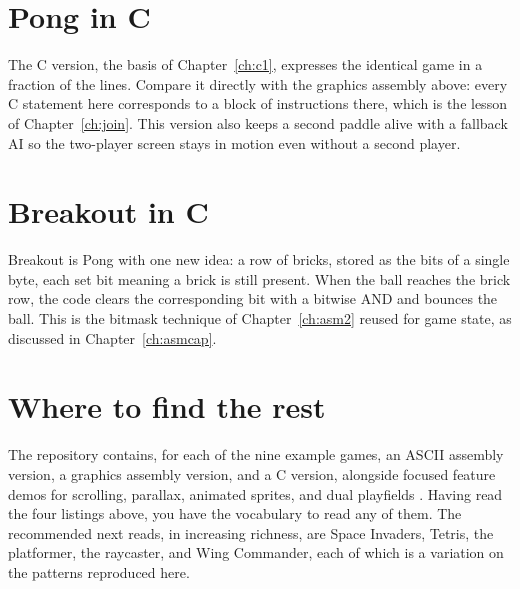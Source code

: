

\section{Pong in C}

The C version, the basis of Chapter~\ref{ch:c1}, expresses the identical game in a
fraction of the lines. Compare it directly with the graphics assembly above: every
C statement here corresponds to a block of instructions there, which is the lesson
of Chapter~\ref{ch:join}. This version also keeps a second paddle alive with a
fallback AI so the two-player screen stays in motion even without a second player.



\section{Breakout in C}

Breakout is Pong with one new idea: a row of bricks, stored as the bits of a single
byte, each set bit meaning a brick is still present. When the ball reaches the
brick row, the code clears the corresponding bit with a bitwise AND and bounces the
ball. This is the bitmask technique of Chapter~\ref{ch:asm2} reused for game state,
as discussed in Chapter~\ref{ch:asmcap}.



\section{Where to find the rest}

The repository contains, for each of the nine example games, an ASCII assembly
version, a graphics assembly version, and a C version, alongside focused feature
demos for scrolling, parallax, animated sprites, and dual playfields
\citep{prg32repo}. Having read the four listings above, you have the vocabulary to
read any of them. The recommended next reads, in increasing richness, are Space
Invaders, Tetris, the platformer, the raycaster, and Wing Commander, each of which
is a variation on the patterns reproduced here.
